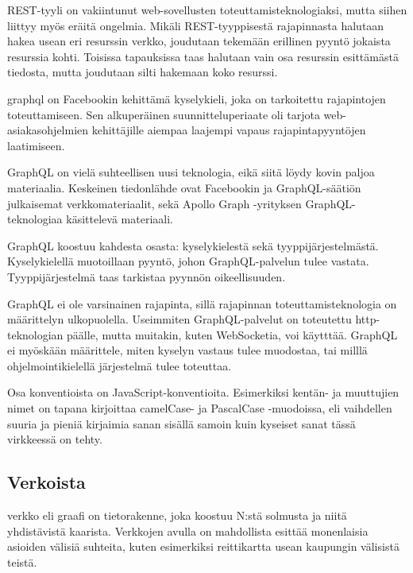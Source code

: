 REST-tyyli on vakiintunut web-sovellusten toteuttamisteknologiaksi,
mutta siihen liittyy myös eräitä ongelmia. Mikäli REST-tyyppisestä
rajapinnasta halutaan hakea usean eri resurssin verkko, joudutaan
tekemään erillinen pyyntö jokaista resurssia kohti. Toisissa tapauksissa
taas halutaan vain osa resurssin esittämästä tiedosta, mutta joudutaan
silti hakemaan koko
resurssi.\cite{betterRESTPrisma}\cite{WhyUseGraphQLApollo}

\gls{graphql} on Facebookin kehittämä kyselykieli, joka on tarkoitettu
rajapintojen toteuttamiseen. Sen alkuperäinen suunnitteluperiaate oli
tarjota web-asiakasohjelmien kehittäjille aiempaa laajempi vapaus
rajapintapyyntöjen laatimiseen. \cite{graphql:spec}

GraphQL on vielä suhteellisen uusi teknologia, eikä siitä löydy kovin
paljoa materiaalia. Keskeinen tiedonlähde ovat
Facebookin\cite{graphql:spec} ja GraphQL-säätiön\cite{GraphQLOrg}
julkaisemat verkkomateriaalit, sekä Apollo Graph -yrityksen
GraphQL-teknologiaa käsittelevä materiaali.\cite{ApolloGraphQL}

GraphQL koostuu kahdesta osasta: kyselykielestä sekä
tyyppijärjestelmästä. Kyselykielellä muotoillaan pyyntö, johon
GraphQL-palvelun tulee vastata. Tyyppijärjestelmä taas tarkistaa pyynnön
oikeellisuuden.

GraphQL ei ole varsinainen rajapinta, sillä rajapinnan
toteuttamisteknologia on määrittelyn ulkopuolella. Useimmiten
GraphQL-palvelut on toteutettu \gls{http}-teknologian päälle, mutta
muitakin, kuten WebSocketia, voi käytttää. GraphQL ei myöskään
määrittele, miten kyselyn vastaus tulee muodostaa, tai milllä
ohjelmointikielellä järjestelmä tulee toteuttaa.

Osa konventioista on JavaScript-konventioita. Esimerkiksi kentän- ja
muuttujien nimet on tapana kirjoittaa camelCase- ja PascalCase
-muodoissa, eli vaihdellen suuria ja pieniä kirjaimia sanan sisällä
samoin kuin kyseiset sanat tässä virkkeessä on
tehty.\cite{GraphQLSchemaBasics}

\hypertarget{verkoista}{%
\subsection{Verkoista}\label{verkoista}}

\gls{verkko} eli graafi on tietorakenne, joka koostuu N:stä solmusta ja
niitä yhdistävistä kaarista.\cite{pozrikidis2014introduction} Verkkojen
avulla on mahdollista esittää monenlaisia asioiden välisiä suhteita,
kuten esimerkiksi reittikartta usean kaupungin välisistä teistä.

